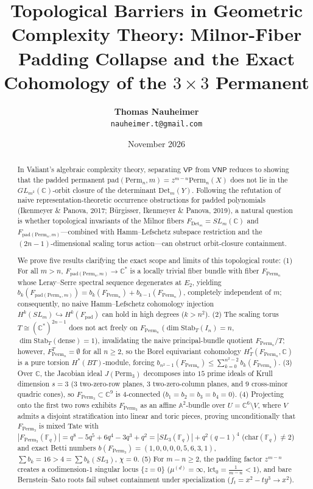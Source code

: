 \documentclass[11pt,a4paper]{article}
\title{\textbf{Topological Barriers in Geometric Complexity Theory: Milnor-Fiber Padding Collapse and the Exact Cohomology of the $3\times 3$ Permanent}}
\author{\textbf{Thomas Nauheimer}\\ \small \texttt{nauheimer.t@gmail.com}}
\date{November 2026}
\theoremstyle{definition}
\begin{document}
\maketitle

\begin{abstract}
In Valiant's algebraic complexity theory, separating $\mathsf{VP}$ from $\mathsf{VNP}$ reduces to showing that the padded permanent $\text{pad}(\text{Perm}_n, m) = z^{m-n}\text{Perm}_n(X)$ does not lie in the $GL_{m^2}(\mathbb{C})$-orbit closure of the determinant $\text{Det}_m(Y)$. Following the refutation of naive representation-theoretic occurrence obstructions for padded polynomials (Ikenmeyer \& Panova, 2017; B\"urgisser, Ikenmeyer \& Panova, 2019), a natural question is whether topological invariants of the Milnor fibers $F_{\text{Det}_m} = SL_m(\mathbb{C})$ and $F_{\text{pad}(\text{Perm}_n, m)}$---combined with Hamm--Lefschetz subspace restriction and the $(2n-1)$-dimensional scaling torus action---can obstruct orbit-closure containment.

We prove five results clarifying the exact scope and limits of this topological route:
(1) For all $m > n$, $F_{\text{pad}(\text{Perm}_n, m)} \to \mathbb{C}^*$ is a locally trivial fiber bundle with fiber $F_{\text{Perm}_n}$ whose Leray--Serre spectral sequence degenerates at $E_2$, yielding $b_k(F_{\text{pad}(\text{Perm}_n, m)}) = b_k(F_{\text{Perm}_n}) + b_{k-1}(F_{\text{Perm}_n})$, completely independent of $m$; consequently, no naive Hamm--Lefschetz cohomology injection $H^k(SL_m) \hookrightarrow H^k(F_{\text{pad}})$ can hold in high degrees ($k > n^2$).
(2) The scaling torus $T \cong (\mathbb{C}^*)^{2n-1}$ does not act freely on $F_{\text{Perm}_n}$ ($\dim \text{Stab}_T(I_n) = n$, $\dim \text{Stab}_T(\text{dense}) = 1$), invalidating the naive principal-bundle quotient $F_{\text{Perm}_n}/T$; however, $F_{\text{Perm}_n}^T = \emptyset$ for all $n \ge 2$, so the Borel equivariant cohomology $H^*_T(F_{\text{Perm}_n}, \mathbb{C})$ is a pure torsion $H^*(BT)$-module, forcing $b_{n^2-1}(F_{\text{Perm}_n}) \le \sum_{k=0}^{n^2-2} b_k(F_{\text{Perm}_n})$.
(3) Over $\mathbb{C}$, the Jacobian ideal $J(\text{Perm}_3)$ decomposes into $15$ prime ideals of Krull dimension $s = 3$ ($3$ two-zero-row planes, $3$ two-zero-column planes, and $9$ cross-minor quadric cones), so $F_{\text{Perm}_3} \subset \mathbb{C}^9$ is $4$-connected ($b_1 = b_2 = b_3 = b_4 = 0$).
(4) Projecting onto the first two rows exhibits $F_{\text{Perm}_3}$ as an affine $\mathbb{A}^2$-bundle over $U = \mathbb{C}^6 \setminus V$, where $V$ admits a disjoint stratification into linear and toric pieces, proving unconditionally that $F_{\text{Perm}_3}$ is mixed Tate with $|F_{\text{Perm}_3}(\mathbb{F}_q)| = q^8 - 5q^5 + 6q^4 - 3q^3 + q^2 = |SL_3(\mathbb{F}_q)| + q^2(q-1)^4$ ($\text{char}(\mathbb{F}_q) \neq 2$) and exact Betti numbers $b(F_{\text{Perm}_3}) = (1, 0, 0, 0, 0, 5, 6, 3, 1)$, $\sum b_k = 16 > 4 = \sum b_k(SL_3)$, $\chi = 0$.
(5) For $m - n \ge 2$, the padding factor $z^{m-n}$ creates a codimension-$1$ singular locus $\{z=0\}$ ($\mu^{(d)} = \infty$, $\text{lct}_0 = \frac{1}{m-n} < 1$), and bare Bernstein--Sato roots fail subset containment under specialization ($f_t = x^2 - ty^3 \to x^2$).
\end{abstract}
\end{document}
